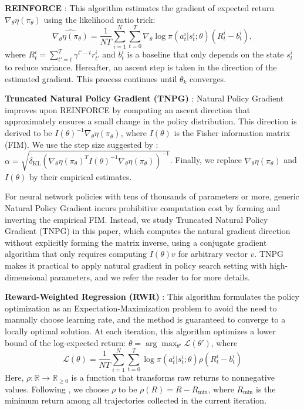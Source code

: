 \documentclass{article}
\newcommand{\cL}{\mathcal{L}}
\newcommand{\bR}{\mathbb{R}}
\begin{document}
{\bf REINFORCE} \cite{Williams92VPG}: This algorithm estimates the gradient of expected return $\nabla_\theta \eta(\pi_\theta)$ using the likelihood ratio trick:
\[\widehat{\nabla_\theta \eta(\pi_\theta)} = \frac{1}{NT} \sum_{i=1}^N \sum_{t=0}^T \nabla_\theta \log \pi(a_t^i|s_t^i; \theta) (R_t^i - b_t^i),\]
where $R_t^i = \sum_{t'=t}^{T} \gamma^{t'-t} r_{t'}^i$ and $b_t^i$ is a baseline that only depends on the state $s_t^i$ to reduce variance. Hereafter, an ascent step is taken in the direction of the estimated gradient. This process continues until $\theta_k$ converges.

{\bf Truncated Natural Policy Gradient (TNPG)} \cite{Kakade02NPG, Peters03PG, Bagnell03Cov, Schulman15TRPO}: Natural Policy Gradient improves upon REINFORCE by computing an ascent direction that approximately ensures a small change in the policy distribution. This direction is derived to be $I(\theta)^{-1} \nabla_\theta \eta(\pi_\theta)$, where $I(\theta)$ is the Fisher information matrix (FIM). We use the step size suggested by \citet{peters2008reinforcement}: $\alpha = \sqrt{\delta_{\text{KL}} \left(\nabla_\theta \eta(\pi_\theta)^T I(\theta)^{-1} \nabla_\theta \eta(\pi_\theta)\right)^{-1}}$. Finally, we replace $\nabla_\theta \eta(\pi_\theta)$ and $I(\theta)$ by their empirical estimates.



For neural network policies with tens of thousands of parameters or more, generic Natural Policy Gradient incurs prohibitive computation cost by forming and inverting the empirical FIM. Instead, we study Truncated Natural Policy Gradient (TNPG) in this paper, which computes the natural gradient direction without explicitly forming the matrix inverse, using a conjugate gradient algorithm that only requires computing $I(\theta)v$ for arbitrary vector $v$. TNPG makes it practical to apply natural gradient in policy search setting with high-dimensional parameters, and we refer the reader to \citet{Schulman15TRPO} for more details.

{\bf Reward-Weighted Regression (RWR)} \cite{Peters07RWR, Kober09POWER}: This algorithm formulates the policy optimization as an Expectation-Maximization problem to avoid the need to manually choose learning rate, and the method is guaranteed to converge to a locally optimal solution. At each iteration, this algorithm optimizes a lower bound of the log-expected return: $\theta = \arg\max_{\theta'} \cL(\theta')$, where
$$\cL(\theta) = \frac{1}{NT} \sum_{i=1}^N \sum_{t=0}^T \log \pi(a_t^i|s_t^i; \theta) \rho(R_t^i - b_t^i)$$
Here, $\rho: \bR \rightarrow \bR_{\geq 0}$ is a function that transforms raw returns to nonnegative values. Following \citet{Deisenroth2013PSSurvey}, we choose $\rho$ to be $\rho(R) = R - R_{\text{min}}$, where $R_{\text{min}}$ is the minimum return among all trajectories collected in the current iteration.
\end{document}
